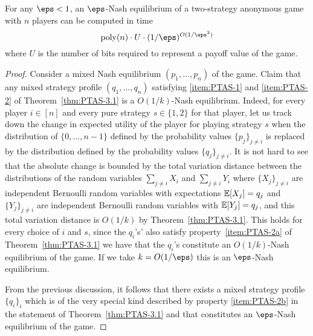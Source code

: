 \begin{theorem}
	\label{thm:PTAS-3.2}
	For any $\eps < 1$, an $\eps$-Nash equilibrium of a two-strategy anonymous game with $n$ players can be computed in time 
	\[\poly(n)\cdot U \cdot (1/\eps)^{O(1/\eps^2)}\]
	where $U$ is the number of bits required to represent a payoff value of the game.
\end{theorem}
\begin{proof}
	Consider a mixed Nash equilibrium $(p_1, \dots, p_n)$ of the game. Claim that any mixed strategy profile $(q_1, \dots, q_n)$ satisfying \ref{item:PTAS-1} and \ref{item:PTAS-2} of Theorem~\ref{thm:PTAS-3.1} is a $O(1/k)$-Nash equilibrium. Indeed, for every player $i \in [n]$ and every pure strategy $s\in\{1,2\}$ for that player, let us track down the change in expected utility of the player for playing strategy $s$ when the distribution of $\{0,\dots, n-1\}$ defined by the probability values $\{p_j\}_{j\neq i}$ is replaced by the distribution defined by the probability values $\{q_j\}_{j\neq i}$. It is not hard to see that the absolute change is bounded by the total variation distance between the distributions of the random variables $\sum_{j\neq i} X_i$ and $\sum_{j\neq i}Y_i$ where $\{X_j\}_{j\neq i}$ are independent Bernoulli random variables with expectations $\mathbb{E}[X_j] = q_j$ and $\{Y_j\}_{j\neq i}$ are independent Bernoulli random variables with $\mathbb{E}[Y_j] = q_j$, and this total variation distance is $O(1/k)$ by Theorem~\ref{thm:PTAS-3.1}. This holds for every choice of $i$ and $s$, since the $q_i$'s' also satisfy property~\ref{item:PTAS-2a} of Theorem~\ref{thm:PTAS-3.1} we have that the $q_i$'s constitute an $O(1/k)$-Nash equilibrium of the game. If we take $k = O(1/\eps)$ this is an $\eps$-Nash equilibrium.

	From the previous discussion, it follows that there exists a mixed strategy profile $\{q_i\}_i$ which is of the very special kind described by property \ref{item:PTAS-2b} in the statement of Theorem~\ref{thm:PTAS-3.1} and that constitutes an $\eps$-Nash equilibrium of the game.
\end{proof}

 